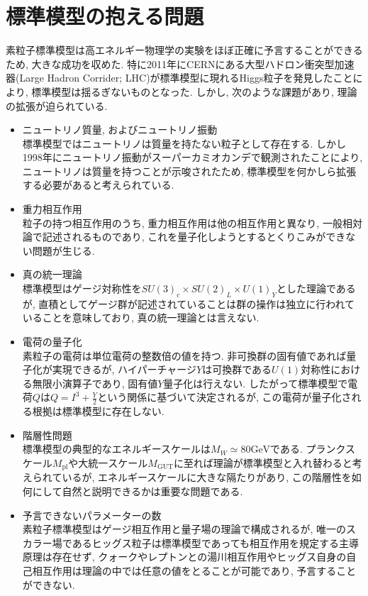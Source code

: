\documentclass[uplatex,dvipdfmx,a4paper,titlepage]{jsbook}
\theoremstyle{plain}
\theoremstyle{definition}
\begin{document}
\section{標準模型の抱える問題}
素粒子標準模型は高エネルギー物理学の実験をほぼ正確に予言することができるため, 大きな成功を収めた.
特に2011年にCERNにある大型ハドロン衝突型加速器(Large Hadron Corrider; LHC)が標準模型に現れるHiggs粒子を発見したことにより, 標準模型は揺るぎないものとなった.
しかし, 次のような課題があり, 理論の拡張が迫られている.
\begin{itemize}
        \item ニュートリノ質量, およびニュートリノ振動\\
              標準模型ではニュートリノは質量を持たない粒子として存在する.
              しかし1998年にニュートリノ振動がスーパーカミオカンデで観測されたことにより, ニュートリノは質量を持つことが示唆されたため, 標準模型を何かしら拡張する必要があると考えられている.
      \item 重力相互作用\\
            粒子の持つ相互作用のうち, 重力相互作用は他の相互作用と異なり, 一般相対論で記述されるものであり, これを量子化しようとするとくりこみができない問題が生じる.
      \item 真の統一理論\\
            標準模型はゲージ対称性を$SU(3)_c\times SU(2)_L\times U(1)_Y$とした理論であるが, 直積としてゲージ群が記述されていることは群の操作は独立に行われていることを意味しており, 真の統一理論とは言えない.
      \item 電荷の量子化\\
            素粒子の電荷は単位電荷の整数倍の値を持つ.
            非可換群の固有値であれば量子化が実現できるが, ハイパーチャージ$Y$は可換群である$U(1)$対称性における無限小演算子であり, 固有値$Y$量子化は行えない.
            したがって標準模型で電荷$Q$は$Q = I^3 + \frac{Y}{2}$という関係に基づいて決定されるが, この電荷が量子化される根拠は標準模型に存在しない.
      \item 階層性問題\\
            標準模型の典型的なエネルギースケールは$M_W\simeq 80\text{GeV}$である.
	    プランクスケール$M_{\mathrm{pl}}$や大統一スケール$M_{\mathrm{GUT}}$に至れば理論が標準模型と入れ替わると考えられているが, エネルギースケールに大きな隔たりがあり, この階層性を如何にして自然と説明できるかは重要な問題である.
      \item 予言できないパラメーターの数\\
            素粒子標準模型はゲージ相互作用と量子場の理論で構成されるが, 唯一のスカラー場であるヒッグス粒子は標準模型であっても相互作用を規定する主導原理は存在せず, クォークやレプトンとの湯川相互作用やヒッグス自身の自己相互作用は理論の中では任意の値をとることが可能であり, 予言することができない.

\end{itemize}
\end{document}

